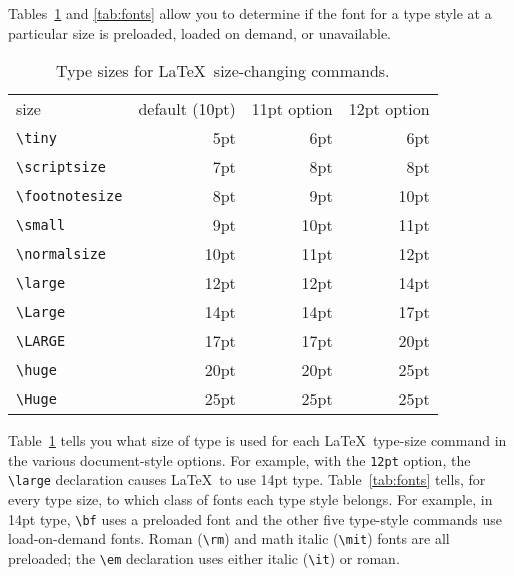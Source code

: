 Tables~\ref{tab:styles} and \ref{tab:fonts} allow you
to determine if the font for a type style at a particular
size is preloaded, loaded on demand, or unavailable.
\begin{table}
\centering
\begin{tabular}{l|r|r|r|}
\multicolumn{1}{l}{size} & 
\multicolumn{1}{c}{default (10pt)} &
        \multicolumn{1}{c}{11pt option}  &
        \multicolumn{1}{c}{12pt option}\\
\cline{2-4}
\verb|\tiny|       & 5pt  & 6pt & 6pt\\
\cline{2-4}
\verb|\scriptsize| & 7pt  & 8pt & 8pt\\
\cline{2-4}
\verb|\footnotesize| & 8pt & 9pt & 10pt \\
\cline{2-4}
\verb|\small|        & 9pt & 10pt & 11pt \\
\cline{2-4}
\verb|\normalsize| & 10pt & 11pt & 12pt \\
\cline{2-4}
\verb|\large|      & 12pt & 12pt & 14pt \\
\cline{2-4}
\verb|\Large|      & 14pt & 14pt & 17pt \\
\cline{2-4}
\verb|\LARGE|      & 17pt & 17pt & 20pt\\
\cline{2-4}
\verb|\huge|       & 20pt & 20pt & 25pt\\
\cline{2-4}
\verb|\Huge|       & 25pt & 25pt & 25pt\\
\cline{2-4}
\end{tabular}
\caption{Type sizes for \LaTeX\ size-changing commands.}\label{tab:styles}
\end{table}

Table~\ref{tab:styles} tells you what size of type is used for each
\LaTeX\ type-size command in the various document-style options.  For
example, with the {\tt 12pt} option, the \hbox{\verb|\large|}
declaration causes \LaTeX\ to use 14pt type.  Table~\ref{tab:fonts}
tells, for every type size, to which class of fonts each type style
belongs.  For example, in 14pt type, \verb|\bf| uses a preloaded
font and the other five type-style commands use load-on-demand fonts.
Roman (\verb|\rm|) and math italic (\verb|\mit|) fonts are all
preloaded; the \hbox{\verb|\em|} declaration uses either italic
(\verb|\it|) or roman.

